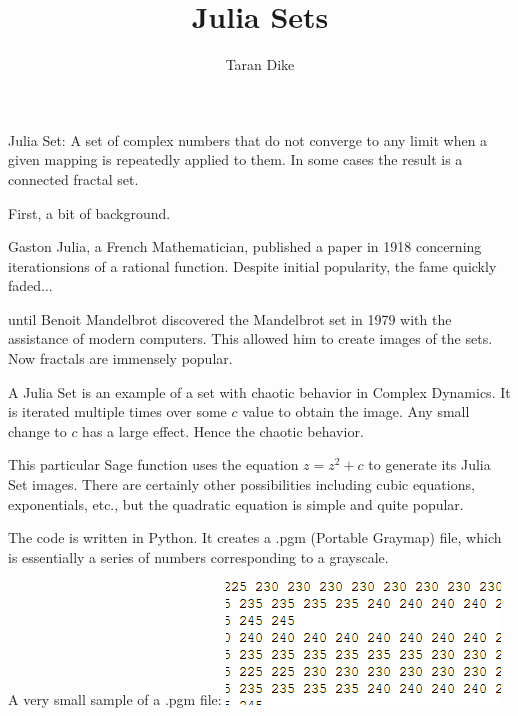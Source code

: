 \documentclass{beamer}
\title{Julia Sets}
\author{Taran Dike}\institute{University of Washington}
\begin{document}
\begin{frame}
\titlepage
\end{frame}

\begin{center}

\begin{frame}
Julia Set:
A set of complex numbers that do not converge to any limit when a given mapping is repeatedly applied to them. In some cases the result is a connected fractal set.
\end{frame}

\begin{frame}
First, a bit of background.
\end{frame}

\begin{frame}
Gaston Julia, a French Mathematician, published a paper in 1918 concerning iterationsions of a rational function.  Despite initial popularity, the fame quickly faded...
\end{frame}

\begin{frame}
until Benoit Mandelbrot discovered the Mandelbrot set in 1979 with the assistance of modern computers.  This allowed him to create images of the sets.  Now fractals are immensely popular.
\end{frame}

\begin{frame}
A Julia Set is an example of a set with chaotic behavior in Complex Dynamics.  It is iterated multiple times over some $c$ value to obtain the image.  Any small change to $c$ has a large effect.  Hence the chaotic behavior.
\end{frame}

\begin{frame}
This particular Sage function uses the equation $z = z^2 + c$ to generate its Julia Set images.  There are certainly other possibilities including cubic equations, exponentials, etc., but the quadratic equation is simple and quite popular.
\end{frame}

\begin{frame}
The code is written in Python.  It creates a .pgm (Portable Graymap) file, which is essentially a series of numbers corresponding to a grayscale.
\end{frame}

\begin{frame}
A very small sample of a .pgm file:
\includegraphics{JuliaPGMScreenshot}
\end{frame}


\end{center}
\end{document}
